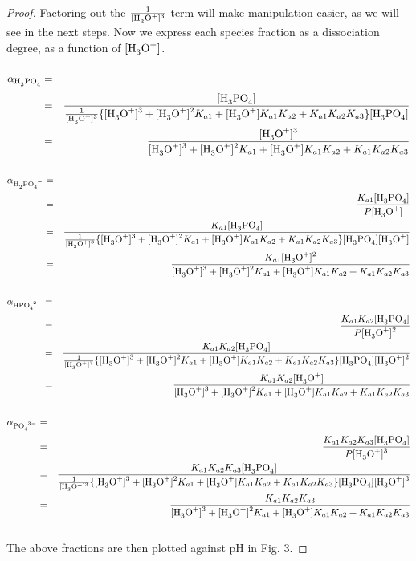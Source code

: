 \documentclass[a4paper,12pt,twocolumn]{article}
\begin{document}
\begin{proof}
	Factoring out the $\frac{1}{\ce{[H3O+]^3}}$ term will make manipulation easier, as we will see in the next steps. Now we express each species fraction as a dissociation degree, as a function of $\ce{[H3O+]}$.

 	\begin{eqnarray}
 		\alpha_{\ce{H3PO4}} & = & \frac{\ce{[H3PO4]}}{P} \hspace{-10cm} \nonumber \\
 		& = & \frac{\ce{[H3PO4]}}{\frac{1}{\ce{[H3O+]^3}} \{ \ce{[H3O+]^3} + \ce{[H3O+]^2}K_{a1} + \ce{[H3O+]}K_{a1}K_{a2} + K_{a1}K_{a2}K_{a3}\}\ce{[H3PO4]}} \nonumber \\
 		& = & \frac{\ce{[H3O+]^3}}{\ce{[H3O+]^3} + \ce{[H3O+]^2}K_{a1} + \ce{[H3O+]}K_{a1}K_{a2} + K_{a1}K_{a2}K_{a3}}
 		\end{eqnarray}

 	\begin{eqnarray}
 		\alpha_{\ce{H2PO4^{-}}} & = & \frac{\ce{[H2PO4^{-}]}}{P} \hspace{-10cm} \nonumber  \\
 		& = & \frac{K_{a1}\ce{[H3PO4]}}{P\ce{[H3O+]}} \nonumber \\
 		& = & \frac{K_{a1}\ce{[H3PO4]}}{\frac{1}{\ce{[H3O+]^3}} \{ \ce{[H3O+]^3} + \ce{[H3O+]^2}K_{a1} + \ce{[H3O+]}K_{a1}K_{a2} + K_{a1}K_{a2}K_{a3}\}\ce{[H3PO4][H3O+]}} \nonumber \\
 		& = & \frac{K_{a1}\ce{[H3O+]^2}}{\ce{[H3O+]^3} + \ce{[H3O+]^2}K_{a1} + \ce{[H3O+]}K_{a1}K_{a2} + K_{a1}K_{a2}K_{a3}}
 		\end{eqnarray}

 	\begin{eqnarray}
 		\alpha_{\ce{HPO4^{2-}}} & = & \frac{\ce{[HPO4^{2-}]}}{P} \hspace{-10cm} \nonumber  \\
 		& = & \frac{K_{a1}K_{a2}\ce{[H3PO4]}}{P\ce{[H3O+]^2}} \nonumber \\
 		& = & \frac{K_{a1}K_{a2}\ce{[H3PO4]}}{\frac{1}{\ce{[H3O+]^3}} \{ \ce{[H3O+]^3} + \ce{[H3O+]^2}K_{a1} + \ce{[H3O+]}K_{a1}K_{a2} + K_{a1}K_{a2}K_{a3}\}\ce{[H3PO4][H3O+]^2}} \nonumber \\
 		& = & \frac{K_{a1}K_{a2}\ce{[H3O+]}}{\ce{[H3O+]^3} + \ce{[H3O+]^2}K_{a1} + \ce{[H3O+]}K_{a1}K_{a2} + K_{a1}K_{a2}K_{a3}}
 		\end{eqnarray}

 	\begin{eqnarray}
 		\alpha_{\ce{PO4^{3-}}} & = & \frac{\ce{[PO4^{3-}]}}{P} \hspace{-10cm} \nonumber  \\
 		& = & \frac{K_{a1}K_{a2}K_{a3}\ce{[H3PO4]}}{P\ce{[H3O+]^3}} \nonumber \\
 		& = & \frac{K_{a1}K_{a2}K_{a3}\ce{[H3PO4]}}{\frac{1}{\ce{[H3O+]^3}} \{ \ce{[H3O+]^3} + \ce{[H3O+]^2}K_{a1} + \ce{[H3O+]}K_{a1}K_{a2} + K_{a1}K_{a2}K_{a3}\}\ce{[H3PO4][H3O+]^3}} \nonumber \\
 		& = & \frac{K_{a1}K_{a2}K_{a3}}{\ce{[H3O+]^3} + \ce{[H3O+]^2}K_{a1} + \ce{[H3O+]}K_{a1}K_{a2} + K_{a1}K_{a2}K_{a3}}
 		\end{eqnarray}
	\\[2\baselineskip]
	The above fractions are then plotted against pH in Fig. 3.


\end{proof}
\end{document}
